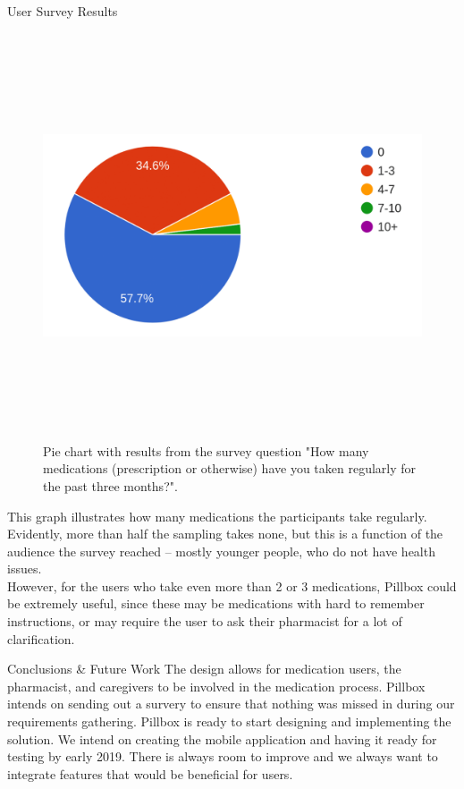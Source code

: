 \documentclass[22pt]{beamer}
\begin{document}
\begin{frame}[fragile]
\begin{textblock}{7.25}
\begin{block}{User Survey Results}
\begin{figure}
\begin{center}
\includegraphics[height=12cm, width=25cm]{medications.png}
\end{center}
\caption{Pie chart with results from the survey question "How many medications (prescription or otherwise) have you taken regularly for the past three months?". }
\end{figure}
This graph illustrates how many medications the participants take regularly. Evidently, more than half the sampling takes none, but this is a function of the audience the survey reached -- mostly younger people, who do not have health issues. 
\\However, for the users who take even more than 2 or 3 medications, Pillbox could be extremely useful, since these may be medications with hard to remember instructions, or may require the user to ask their pharmacist for a lot of clarification.
\end{block}

\begin{block}{Conclusions \& Future Work}
The design allows for medication users, the pharmacist, and caregivers to be involved in the medication process. Pillbox intends on sending out a survery to ensure that nothing was missed in during our requirements gathering. Pillbox is ready to start designing and implementing the solution. We intend on creating the mobile application and having it ready for testing by early 2019. There is always room to improve and we always want to integrate features that would be beneficial for users.
\end{block}



\end{textblock}
\end{frame}
\end{document}
